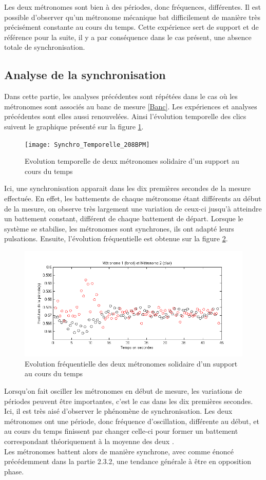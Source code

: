 \documentclass[a4paper,11pt]{report}
\begin{document}
Les deux métronomes sont bien à des périodes, donc fréquences, différentes. Il est possible d'observer qu'un métronome mécanique bat difficilement de manière très précisément constante au cours du temps. Cette expérience sert de support et de référence pour la suite, il y a par conséquence dans le cas présent, une absence totale de synchronisation.

\subsection{Analyse de la synchronisation}
Dans cette partie, les analyses précédentes sont répétées dans le cas où les métronomes sont associés au banc de mesure \ref{Banc}. Les expériences et analyses précédentes sont elles aussi renouvelées. Ainsi l'évolution temporelle des clics suivent le graphique présenté sur la figure \ref{SynchronisationT}.
\begin{figure}[h]
\centering
\texttt{[image: Synchro\_Temporelle\_208BPM]}
\caption{Evolution temporelle de deux métronomes solidaire d'un support au cours du temps}\label{SynchronisationT}
\end{figure}
Ici, une synchronisation apparait dans les dix premières secondes de la mesure effectuée. En effet, les battements de chaque métronome étant différents au début de la mesure, on observe très largement une variation de ceux-ci jusqu'à atteindre un battement constant, différent de chaque battement de départ. Lorsque le système se stabilise, les métronomes sont synchrones, ils ont adapté leurs pulsations. Ensuite, l'évolution fréquentielle est obtenue sur la figure \ref{SynchronisationF}.
\begin{figure}[!h]
\centering
\includegraphics[width=1\textwidth]{Synchro_Frequence_208BPM}
\caption{Evolution fréquentielle des deux métronomes solidaire d'un support au cours du temps}\label{SynchronisationF}
\end{figure}
Lorsqu'on fait osciller les métronomes en début de mesure, les variations de périodes peuvent être importantes, c'est le cas dans les dix premières secondes. Ici, il est très aisé d'observer le phénomène de synchronisation. Les deux métronomes ont une période, donc fréquence d'oscillation, différente au début, et au cours du temps finissent par changer celle-ci pour former un battement correspondant théoriquement à la moyenne des deux \cite{piko}.\\Les métronomes battent alors de manière synchrone, avec comme énoncé précédemment dans la partie 2.3.2, une tendance générale à être en opposition phase.
\end{document}
